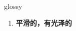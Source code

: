 
\begin{frame}
{\huge glossy}
\begin{center}
\begin{enumerate}\Large
  \item \textbf{平滑的，有光泽的}
\end{enumerate}
\end{center}
\end{frame}
